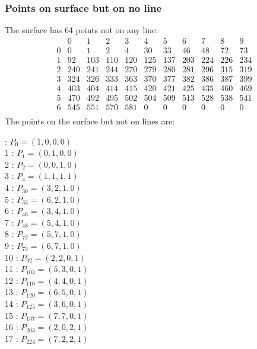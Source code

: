 \documentclass{article}
\begin{document}
{\subsubsection*{Points on surface but on no line}
The surface has 64 points not on any line:\\
$$
\begin{array}{r|*{10}{r}}
 & 0 & 1 & 2 & 3 & 4 & 5 & 6 & 7 & 8 & 9\\
\hline
0 & 0 & 1 & 2 & 4 & 30 & 33 & 46 & 48 & 72 & 73\\
1 & 92 & 103 & 110 & 120 & 125 & 137 & 203 & 224 & 226 & 234\\
2 & 240 & 241 & 244 & 270 & 279 & 280 & 281 & 296 & 315 & 319\\
3 & 324 & 326 & 333 & 363 & 370 & 377 & 382 & 386 & 387 & 399\\
4 & 403 & 404 & 414 & 415 & 420 & 421 & 425 & 435 & 460 & 469\\
5 & 470 & 492 & 495 & 502 & 504 & 509 & 513 & 528 & 538 & 541\\
6 & 545 & 551 & 570 & 581 & 0 & 0 & 0 & 0 & 0 & 0\\
\end{array}
$$
The points on the surface but not on lines are:\\
\begin{multicols}{2}
 : $P_{0}=( 1, 0, 0, 0 )$\\
1 : $P_{1}=( 0, 1, 0, 0 )$\\
2 : $P_{2}=( 0, 0, 1, 0 )$\\
3 : $P_{4}=( 1, 1, 1, 1 )$\\
4 : $P_{30}=( 3, 2, 1, 0 )$\\
5 : $P_{33}=( 6, 2, 1, 0 )$\\
6 : $P_{46}=( 3, 4, 1, 0 )$\\
7 : $P_{48}=( 5, 4, 1, 0 )$\\
8 : $P_{72}=( 5, 7, 1, 0 )$\\
9 : $P_{73}=( 6, 7, 1, 0 )$\\
10 : $P_{92}=( 2, 2, 0, 1 )$\\
11 : $P_{103}=( 5, 3, 0, 1 )$\\
12 : $P_{110}=( 4, 4, 0, 1 )$\\
13 : $P_{120}=( 6, 5, 0, 1 )$\\
14 : $P_{125}=( 3, 6, 0, 1 )$\\
15 : $P_{137}=( 7, 7, 0, 1 )$\\
16 : $P_{203}=( 2, 0, 2, 1 )$\\
17 : $P_{224}=( 7, 2, 2, 1 )$\\

\end{multicols}}
\end{document}
